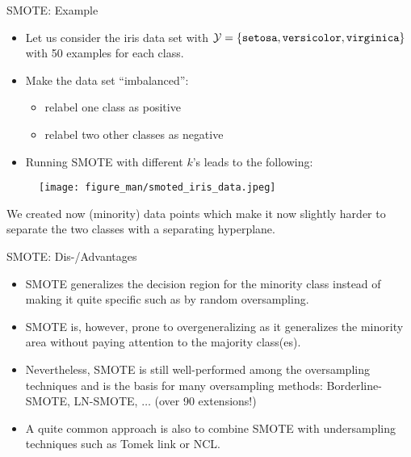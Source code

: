 \documentclass[11pt,compress,t,notes=noshow, xcolor=table]{beamer}
\begin{document}
		
	\begin{frame}{SMOTE: Example}
		\footnotesize
		
		\begin{itemize}
			\item Let us consider the iris data set with $\mathcal{Y}=\{ \texttt{setosa},\texttt{versicolor},\texttt{virginica}  \}$ with 50 examples for each class.
			
			\item Make the data set ``imbalanced'': 
            \begin{itemize}
                \footnotesize
                \item relabel one class as positive
                \item relabel two other classes as negative
            \end{itemize}
            
			\item Running SMOTE with different $k$'s leads to the following:
		\end{itemize}		
%		
		\begin{figure}
			\centering
			\texttt{[image: figure\_man/smoted\_iris\_data.jpeg]}
		\end{figure}
		We created now (minority) data points which make it now slightly harder to separate the two classes with a separating hyperplane.
	\end{frame}


	\begin{frame}{SMOTE: Dis-/Advantages}

		\small

		\begin{itemize}
		
			\item SMOTE generalizes the decision region for the minority class instead of making it quite specific such as by random oversampling. 
            \vspace{10pt}
		
			\item SMOTE is, however, prone to overgeneralizing as it generalizes the minority area without paying attention to the majority class(es).
            \vspace{10pt}

		
			\item Nevertheless, SMOTE is still well-performed among the oversampling techniques and is the basis for many oversampling methods: Borderline-SMOTE, LN-SMOTE, $\ldots$ (over 90 extensions!)
            \vspace{10pt}

			\item A quite common approach is also to combine SMOTE with undersampling techniques such as Tomek link or NCL.

		\end{itemize}		

	\end{frame}


	\endlecture
\end{document}
